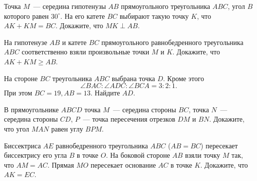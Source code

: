 \begin{problems}
\item Точка $M$~--- середина гипотенузы $AB$ прямоугольного треугольника $ABC$, угол $B$ которого равен $30^\circ$. На его катете $BC$ выбирают такую точку $K$, что $AK + KM = BC$. Докажите, что $MK\perp AB$.

\item На гипотенузе $AB$ и катете $BC$ прямоугольного равнобедренного треугольника $ABC$ соответственно взяли произвольные точки $M$ и $K$. Докажите, что $AK + KM \geqslant AB$.


\item На стороне $BC$ треугольника $ABC$ выбрана точка $D$. Кроме этого $$\angle{BAC}:\angle{ADC}:\angle{BCA}=3:2:1.$$ 
При этом $BC=19, AB=13$. Найдите $AD$.

\item В прямоугольнике $ABCD$ точка $M$~--- середина стороны $BC$, точка $N$~--- середина стороны $CD$, $P$~--- точка пересечения отрезков $DM$ и $BN$. Докажите, что угол $MAN$ равен углу $BPM$.

\item Биссектриса $AE$ равнобедренного треугольника $ABC$ ($AB = BC$) пересекает биссектрису его угла $B$ в точке $O$. На боковой стороне $AB$ взяли точку $M$ так, что $AM = AC$. Прямая $MO$ пересекает основание $AC$ в точке $K$. Докажите, что $AK = EC$.


\end{problems}
